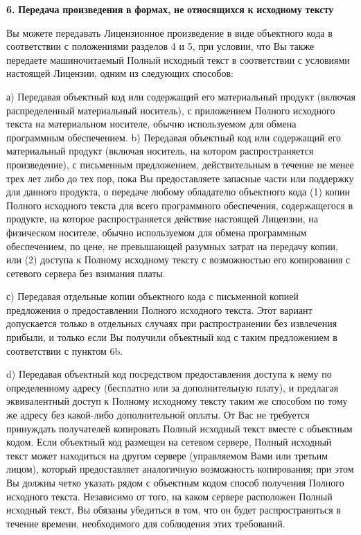 {\bfseries{6.}} {\bfseries{Передача}} {\bfseries{произведения}} {\bfseries{в}} {\bfseries{формах,}} {\bfseries{не}} {\bfseries{относящихся}} {\bfseries{к}} {\bfseries{исходному}} {\bfseries{тексту}}

Вы можете передавать Лицензионное произведение в виде объектного кода в соответствии с положениями разделов 4 и 5, при условии, что Вы также передаете машиночитаемый Полный исходный текст в соответствии с условиями настоящей Лицензии, одним из следующих способов\+:

а) Передавая объектный код или содержащий его материальный продукт (включая распределенный материальный носитель), с приложением Полного исходного текста на материальном носителе, обычно используемом для обмена программным обеспечением. b) Передавая объектный код или содержащий его материальный продукт (включая носитель, на котором распространяется произведение), с письменным предложением, действительным в течение не менее трех лет либо до тех пор, пока Вы предоставляете запасные части или поддержку для данного продукта, о передаче любому обладателю объектного кода (1) копии Полного исходного текста для всего программного обеспечения, содержащегося в продукте, на которое распространяется действие настоящей Лицензии, на физическом носителе, обычно используемом для обмена программным обеспечением, по цене, не превышающей разумных затрат на передачу копии, или (2) доступа к Полному исходному тексту с возможностью его копирования с сетевого сервера без взимания платы.

с) Передавая отдельные копии объектного кода с письменной копией предложения о предоставлении Полного исходного текста. Этот вариант допускается только в отдельных случаях при распространении без извлечения прибыли, и только если Вы получили объектный код с таким предложением в соответствии с пунктом 6b.

d) Передавая объектный код посредством предоставления доступа к нему по определенному адресу (бесплатно или за дополнительную плату), и предлагая эквивалентный доступ к Полному исходному тексту таким же способом по тому же адресу без какой-\/либо дополнительной оплаты. От Вас не требуется принуждать получателей копировать Полный исходный текст вместе с объектным кодом. Если объектный код размещен на сетевом сервере, Полный исходный текст может находиться на другом сервере (управляемом Вами или третьим лицом), который предоставляет аналогичную возможность копирования; при этом Вы должны четко указать рядом с объектным кодом способ получения Полного исходного текста. Независимо от того, на каком сервере расположен Полный исходный текст, Вы обязаны убедиться в том, что он будет распространяться в течение времени, необходимого для соблюдения этих требований.

